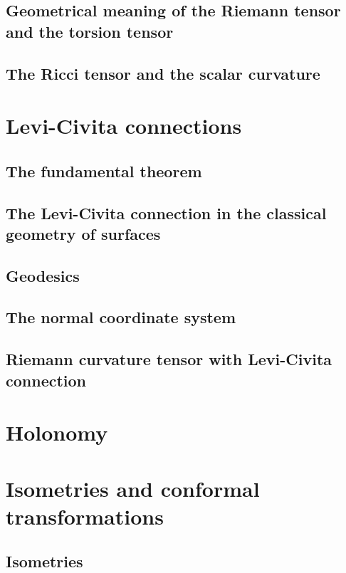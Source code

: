 \documentclass{book}
\begin{document}
\subsection{ Geometrical meaning of the Riemann tensor and the torsion tensor }

\subsection{ The Ricci tensor and the scalar curvature }

\section{ Levi-Civita connections }

\subsection{ The fundamental theorem }

\subsection{ The Levi-Civita connection in the classical geometry of surfaces }

\subsection{ Geodesics }

\subsection{ The normal coordinate system }

\subsection{ Riemann curvature tensor with Levi-Civita connection}

\section{ Holonomy }

\section{ Isometries and conformal transformations }

\subsection{ Isometries }
\end{document}
